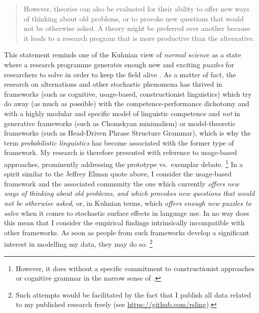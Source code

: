 \begin{quote}
  However, theories can also be evaluated for their ability to offer new ways of thinking about old problems, or to provoke new questions that would not be otherwise asked.
  A theory might be preferred over another because it leads to a research program that is more productive than the alternative.
\end{quote}

This statement reminds one of the Kuhnian view of \textit{normal science} as a state where a research programme generates enough new and exciting \textit{puzzles} for researchers to solve in order to keep the field alive \citep{Kuhn1970}.
As a matter of fact, the research on alternations and other stochastic phenomena has thrived in frameworks (such as cognitive, usage-based, constructionist linguistics) which try do away (as much as possible) with the competence-performance dichotomy and with a highly modular and specific model of linguistic competence and \textit{not} in generative frameworks (such as Chomskyan minimalism) or model-theoretic frameworks (such as Head-Driven Phrase Structure Grammar), which is why the term \textit{probabilistic linguistics} has become associated with the former type of framework.
My research is therefore presented with reference to usage-based approaches, prominently addressing the prototype vs.\ exemplar debate.%
\footnote{However, it does without a specific commitment to constructionist approaches or cognitive grammar in the narrow sense of \citet{Langacker1987}.}
In a spirit similar to the Jeffrey Elman quote above, I consider the usage-based framework and the associated community the one which currently \textit{offers new ways of thinking about old problems, and which provokes new questions that would not be otherwise asked}, or, in Kuhnian terms, which \textit{offers enough new puzzles to solve} when it comes to stochastic surface effects in language use.
In no way does this mean that I consider the empirical findings intrinsically incompatible with other frameworks.
As soon as people from such frameworks develop a significant interest in modelling my data, they may do so.%
\footnote{Such attempts would be facilitated by the fact that I publish all data related to my published research freely (see \url{https://github.com/rsling}).}

